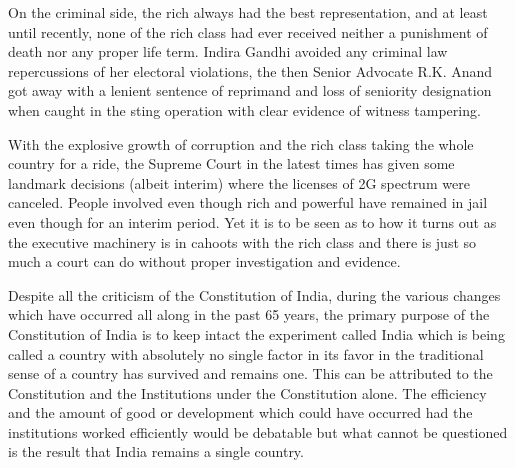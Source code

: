 \begin{multicols}{2}

\noi
On the criminal side, the rich always had the best representation, and at least until recently, none of the rich class had ever received neither a punishment of death nor any proper life term. Indira Gandhi avoided any criminal law repercussions of her electoral violations, the then Senior Advocate R.K. Anand got away with a lenient sentence of reprimand and loss of seniority designation when caught in the sting operation with clear evidence of witness tampering.

\newpage

\noi
With the explosive growth of corruption and the rich class taking the whole country for a ride, the Supreme Court in the latest times has given some landmark decisions (albeit interim) where the licenses of 2G spectrum were canceled. People involved even though rich and powerful have remained in jail even though for an interim period. Yet it is to be seen as to how it turns out as the executive machinery is in cahoots with the rich class and there is just so much a court can do without proper investigation and evidence.

\vspace{5cm}


\noi
Despite all the criticism of the Constitution of India, during the various changes which have occurred all along in the past 65 years, the primary purpose of the Constitution of India is to keep intact the experiment called India which is being called a country with absolutely no single factor in its favor in the traditional sense of a country has survived and remains one. This can be attributed to the Constitution and the Institutions under the Constitution alone. The efficiency and the amount of good or development which could have occurred had the institutions worked efficiently would be debatable but what cannot be questioned is the result that India remains a single country.



\end{multicols}
\label{end2016-art4}
